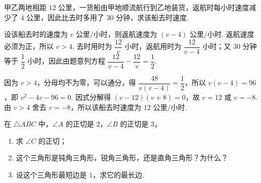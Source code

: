 \begin{problem}
甲乙两地相距 \(12\text{ 公里}\)，一货船由甲地顺流航行到乙地装货，返航时每小时速度减少了 \(4\text{ 公里}\)，因此比去时多用了 \(30\text{ 分钟}\)，求该船去时速度.
\end{problem}

\begin{solution}
设该船去时的速度为 \(v\text{ 公里/小时}\)，则返航速度为 \((v-4)\text{ 公里/小时}\). 返航速度必须为正，所以 \(v>4\). 去时用时为 \(\dfrac{12}{v}\) 小时，返航用时为 \(\dfrac{12}{v-4}\) 小时；又 \(30\) 分钟等于 \(\dfrac{1}{2}\) 小时，因此由题意列方程 \(\dfrac{12}{v-4}-\dfrac{12}{v}=\dfrac{1}{2}\).

因为 \(v>4\)，分母均不为零，可以通分，得 \(\dfrac{48}{v(v-4)}=\dfrac{1}{2}\)，所以 \(v(v-4)=96\)，即 \(v^2-4v-96=0\). 因式分解得 \((v-12)(v+8)=0\)，故 \(v=12\) 或 \(v=-8\). 由 \(v>4\) 舍去 \(v=-8\)，所以该船去时速度为 \(12\text{ 公里/小时}\).
\end{solution}

\begin{problem}
在 \(\triangle ABC\) 中，\(\angle A\) 的正切是 \(2\)，\(\angle B\) 的正切是 \(3\)，

\begin{enumerate}
    \item 求 \(\angle C\) 的正切；
    \item 这个三角形是钝角三角形，锐角三角形，还是直角三角形？为什么？
    \item 设这个三角形最短边是 \(1\)，求它的最长边.
\end{enumerate}
\end{problem}

